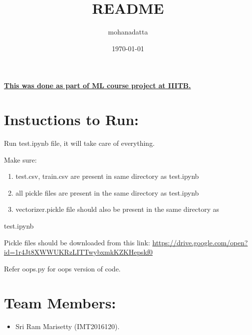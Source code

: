 \documentclass[11pt]{article}
\author{mohanadatta}
\date{\today}
\title{README}
\begin{document}
\maketitle
\textbf{\uline{This was done as part of ML course project at IIITB.}}

\section{Instuctions to Run:}
\label{sec-1}
Run test.ipynb file, it will take care of everything.


Make sure:

\begin{enumerate}
\item test.csv, train.csv are present in same directory as test.ipynb
\item all  pickle files are present in the same directory as test.ipynb
\item vectorizer.pickle file should also be present in the same directory as
\end{enumerate}
test.ipynb

Pickle files should be downloaded from this link: 
\url{https://drive.google.com/open?id=1r4Jt8XWWUKRzLITTwybxmkKZKHepskf0}

Refer oops.py for oops version of code.





\section{Team Members:}
\label{sec-2}
\begin{itemize}
\item Sri Ram Marisetty (IMT2016120).
\end{itemize}
\end{document}
